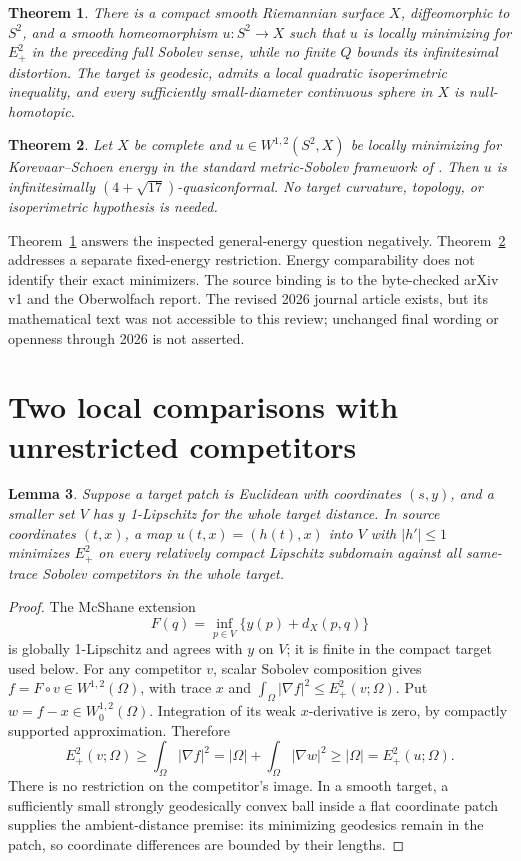\documentclass[11pt]{article}
\newtheorem{theorem}{Theorem}
\newtheorem{lemma}[theorem]{Lemma}
\newcommand{\Ep}{E_+^2}
\begin{document}
\begin{theorem}\label{thm:negative}
There is a compact smooth Riemannian surface $X$, diffeomorphic to $S^2$,
and a smooth homeomorphism $u:S^2\to X$ such that $u$ is locally minimizing
for $\Ep$ in the preceding full Sobolev sense, while no finite $Q$ bounds its
infinitesimal distortion. The target is geodesic, admits a local quadratic
isoperimetric inequality, and every sufficiently small-diameter continuous
sphere in $X$ is null-homotopic.
\end{theorem}

\begin{theorem}\label{thm:positive}
Let $X$ be complete and $u\in W^{1,2}(S^2,X)$ be locally minimizing for
Korevaar--Schoen energy in the standard metric-Sobolev framework of
\cite{mvw}. Then $u$ is infinitesimally $(4+\sqrt{17})$-quasiconformal.
No target curvature, topology, or isoperimetric hypothesis is needed.
\end{theorem}

Theorem~\ref{thm:negative} answers the inspected general-energy question
negatively. Theorem~\ref{thm:positive} addresses a separate fixed-energy
restriction. Energy comparability does not identify their exact minimizers.
The source binding is to the byte-checked arXiv v1 and the Oberwolfach report.
The revised 2026 journal article exists, but its mathematical text was not
accessible to this review; unchanged final wording or openness through 2026
is not asserted.

\section{Two local comparisons with unrestricted competitors}
\begin{lemma}\label{lem:flat}
Suppose a target patch is Euclidean with coordinates $(s,y)$, and a smaller
set $V$ has $y$ 1-Lipschitz for the whole target distance. In source coordinates
$(t,x)$, a map $u(t,x)=(h(t),x)$ into $V$ with $|h'|\le1$ minimizes $\Ep$
on every relatively compact Lipschitz subdomain against all same-trace Sobolev
competitors in the whole target.
\end{lemma}
\begin{proof}
The McShane extension \cite{mcshane}
\[
 F(q)=\inf_{p\in V}\{y(p)+d_X(p,q)\}
\]
is globally 1-Lipschitz and agrees with $y$ on $V$; it is finite in the compact
target used below. For any competitor $v$, scalar Sobolev composition gives
$f=F\circ v\in W^{1,2}(\Omega)$, with trace $x$ and
$\int_\Omega|\nabla f|^2\le\Ep(v;\Omega)$. Put
$w=f-x\in W^{1,2}_0(\Omega)$. Integration of its weak $x$-derivative is zero,
by compactly supported approximation. Therefore
\[
 \Ep(v;\Omega)\ge\int_\Omega|\nabla f|^2
 =|\Omega|+\int_\Omega|\nabla w|^2\ge|\Omega|
 =\Ep(u;\Omega).
\]
There is no restriction on the competitor's image. In a smooth target, a
sufficiently small strongly geodesically convex ball inside a flat coordinate
patch supplies the ambient-distance premise: its minimizing geodesics remain
in the patch, so coordinate differences are bounded by their lengths.
\end{proof}
\end{document}
